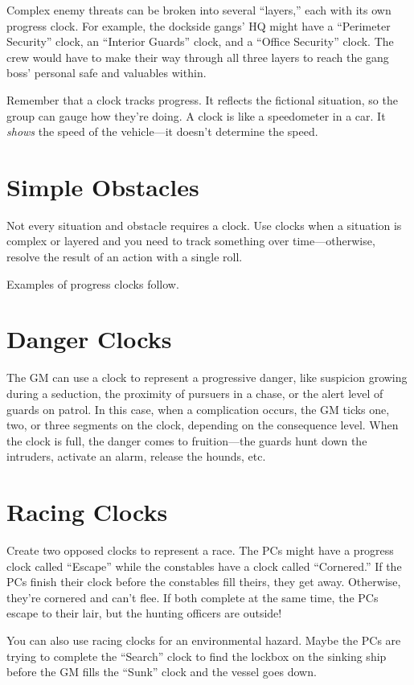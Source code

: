 \documentclass[11pt,oneside]{book}
\begin{document}
Complex enemy threats can be broken into several “layers,” each with its own progress clock. For example, the dockside gangs’ HQ might have a “Perimeter Security” clock, an “Interior Guards” clock, and a “Office Security” clock. The crew would have to make their way through all three layers to reach the gang boss’ personal safe and valuables within.

Remember that a clock tracks progress. It reflects the fictional situation, so the group can gauge how they’re doing. A clock is like a speedometer in a car. It \emph{shows} the speed of the vehicle---it doesn’t determine the speed.

\section{Simple Obstacles}

Not every situation and obstacle requires a clock. Use clocks when a situation is complex or layered and you need to track something over time---otherwise, resolve the result of an action with a single roll.

Examples of progress clocks follow.

\section{Danger Clocks}

The GM can use a clock to represent a progressive danger, like suspicion growing during a seduction, the proximity of pursuers in a chase, or the alert level of guards on patrol. In this case, when a complication occurs, the GM ticks one, two, or three segments on the clock, depending on the consequence level. When the clock is full, the danger comes to fruition---the guards hunt down the intruders, activate an alarm, release the hounds, etc.

\section{Racing Clocks}

Create two opposed clocks to represent a race. The PCs might have a progress clock called “Escape” while the constables have a clock called “Cornered.” If the PCs finish their clock before the constables fill theirs, they get away. Otherwise, they’re cornered and can’t flee. If both complete at the same time, the PCs escape to their lair, but the hunting officers are outside!

You can also use racing clocks for an environmental hazard. Maybe the PCs are trying to complete the “Search” clock to find the lockbox on the sinking ship before the GM fills the “Sunk” clock and the vessel goes down.
\end{document}
